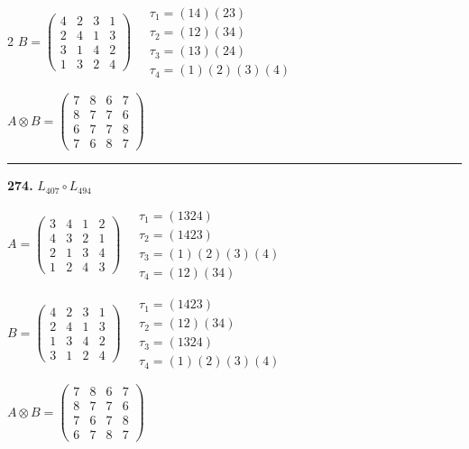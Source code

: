 \begin{multicols}{2}
$B = \begin{pmatrix} 4 & 2 & 3 & 1 \\ 2 & 4 & 1 & 3 \\ 3 & 1 & 4 & 2 \\ 1 & 3 & 2 & 4 \end{pmatrix} \quad \begin{matrix} \tau_{1}=(1 4)(2 3) \\ \tau_{2}=(1 2)(3 4) \\ \tau_{3}=(1 3)(2 4) \\ \tau_{4}=(1)(2)(3)(4) \end{matrix}$

$A \otimes B = \begin{pmatrix} 7 & 8 & 6 & 7 \\ 8 & 7 & 7 & 6 \\ 6 & 7 & 7 & 8 \\ 7 & 6 & 8 & 7 \end{pmatrix}$

\vspace{0.3em}
\hrule
\vspace{0.3em}

\noindent\textbf{274.} $L_{407} \circ L_{494}$

$A = \begin{pmatrix} 3 & 4 & 1 & 2 \\ 4 & 3 & 2 & 1 \\ 2 & 1 & 3 & 4 \\ 1 & 2 & 4 & 3 \end{pmatrix} \quad \begin{matrix} \tau_{1}=(1 3 2 4) \\ \tau_{2}=(1 4 2 3) \\ \tau_{3}=(1)(2)(3)(4) \\ \tau_{4}=(1 2)(3 4) \end{matrix}$

$B = \begin{pmatrix} 4 & 2 & 3 & 1 \\ 2 & 4 & 1 & 3 \\ 1 & 3 & 4 & 2 \\ 3 & 1 & 2 & 4 \end{pmatrix} \quad \begin{matrix} \tau_{1}=(1 4 2 3) \\ \tau_{2}=(1 2)(3 4) \\ \tau_{3}=(1 3 2 4) \\ \tau_{4}=(1)(2)(3)(4) \end{matrix}$

$A \otimes B = \begin{pmatrix} 7 & 8 & 6 & 7 \\ 8 & 7 & 7 & 6 \\ 7 & 6 & 7 & 8 \\ 6 & 7 & 8 & 7 \end{pmatrix}$


\end{multicols}
